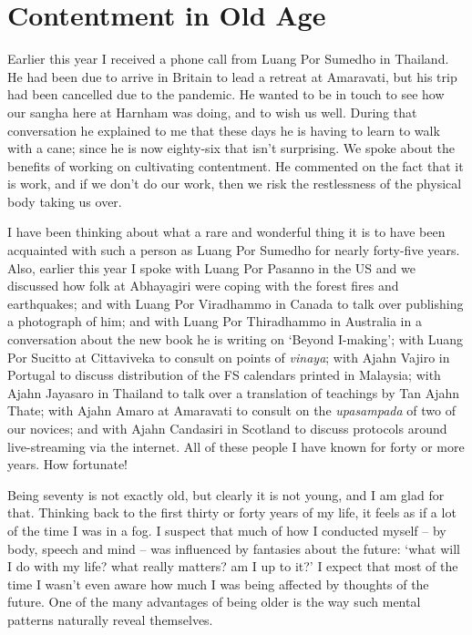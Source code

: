 \section{Contentment in Old Age}

Earlier this year I received a phone call from Luang Por Sumedho in
Thailand. He had been due to arrive in Britain to lead a retreat at
Amaravati, but his trip had been cancelled due to the pandemic. He
wanted to be in touch to see how our sangha here at Harnham was doing,
and to wish us well. During that conversation he explained to me that
these days he is having to learn to walk with a cane; since he is now
eighty-six that isn't surprising. We spoke about the benefits of working
on cultivating contentment. He commented on the fact that it is work,
and if we don't do our work, then we risk the restlessness of the
physical body taking us over.

I have been thinking about what a rare and wonderful thing it is to have
been acquainted with such a person as Luang Por Sumedho for nearly
forty-five years. Also, earlier this year I spoke with Luang Por Pasanno
in the US and we discussed how folk at Abhayagiri were coping with the
forest fires and earthquakes; and with Luang Por Viradhammo in Canada to
talk over publishing a photograph of him; and with Luang Por Thiradhammo
in Australia in a conversation about the new book he is writing on
`Beyond I-making'; with Luang Por Sucitto at Cittaviveka to consult on
points of \emph{vinaya}; with Ajahn Vajiro in Portugal to discuss
distribution of the FS calendars printed in Malaysia; with Ajahn
Jayasaro in Thailand to talk over a translation of teachings by Tan
Ajahn Thate; with Ajahn Amaro at Amaravati to consult on the
\emph{upasampada} of two of our novices; and with Ajahn Candasiri in
Scotland to discuss protocols around \mbox{live-streaming} via the internet.
All of these people I have known for forty or more years. How fortunate!

Being seventy is not exactly old, but clearly it is not young, and I am
glad for that. Thinking back to the first thirty or forty years of my
life, it feels as if a lot of the time I was in a fog. I suspect that
much of how I conducted myself -- by body, speech and mind -- was
influenced by fantasies about the future: `what will I do with my life?
what really matters? am I up to it?' I expect that most of the time I
wasn't even aware how much I was being affected by thoughts of the
future. One of the many advantages of being older is the way such mental
patterns naturally reveal themselves.

